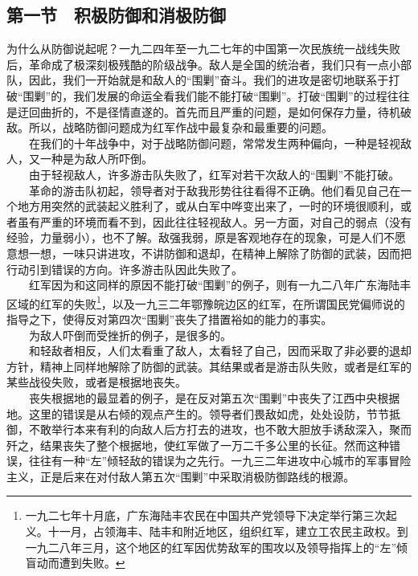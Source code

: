 \documentclass[cn,11pt,chinese]{elegantbook}
\def\myformat#1{\hfil\hfil #1}
\begin{document}
\subsection*{\myformat{第一节　积极防御和消极防御}}
为什么从防御说起呢？一九二四年至一九二七年的中国第一次民族统一战线失败后，革命成了极深刻极残酷的阶级战争。敌人是全国的统治者，我们只有一点小部队，因此，我们一开始就是和敌人的“围剿”奋斗。我们的进攻是密切地联系于打破“围剿”的，我们发展的命运全看我们能不能打破“围剿”。打破“围剿”的过程往往是迂回曲折的，不是径情直遂的。首先而且严重的问题，是如何保存力量，待机破敌。所以，战略防御问题成为红军作战中最复杂和最重要的问题。\\
　　在我们的十年战争中，对于战略防御问题，常常发生两种偏向，一种是轻视敌人，又一种是为敌人所吓倒。\\
　　由于轻视敌人，许多游击队失败了，红军对若干次敌人的“围剿”不能打破。\\
　　革命的游击队初起，领导者对于敌我形势往往看得不正确。他们看见自己在一个地方用突然的武装起义胜利了，或从白军中哗变出来了，一时的环境很顺利，或者虽有严重的环境而看不到，因此往往轻视敌人。另一方面，对自己的弱点（没有经验，力量弱小），也不了解。敌强我弱，原是客观地存在的现象，可是人们不愿意想一想，一味只讲进攻，不讲防御和退却，在精神上解除了防御的武装，因而把行动引到错误的方向。许多游击队因此失败了。\\
　　红军因为和这同样的原因不能打破“围剿”的例子，则有一九二八年广东海陆丰区域的红军的失败\footnote[24]{ 一九二七年十月底，广东海陆丰农民在中国共产党领导下决定举行第三次起义。十一月，占领海丰、陆丰和附近地区，组织红军，建立工农民主政权。到一九二八年三月，这个地区的红军因优势敌军的围攻以及领导指挥上的“左”倾盲动而遭到失败。}，以及一九三二年鄂豫皖边区的红军，在所谓国民党偏师说的指导之下，使得反对第四次“围剿”丧失了措置裕如的能力的事实。\\
　　为敌人吓倒而受挫折的例子，是很多的。\\
　　和轻敌者相反，人们太看重了敌人，太看轻了自己，因而采取了非必要的退却方针，精神上同样地解除了防御的武装。其结果或者是游击队失败，或者是红军的某些战役失败，或者是根据地丧失。\\
　　丧失根据地的最显着的例子，是在反对第五次“围剿”中丧失了江西中央根据地。这里的错误是从右倾的观点产生的。领导者们畏敌如虎，处处设防，节节抵御，不敢举行本来有利的向敌人后方打去的进攻，也不敢大胆放手诱敌深入，聚而歼之，结果丧失了整个根据地，使红军做了一万二千多公里的长征。然而这种错误，往往有一种“左”倾轻敌的错误为之先行。一九三二年进攻中心城市的军事冒险主义，正是后来在对付敌人第五次“围剿”中采取消极防御路线的根源。\\
\end{document}
